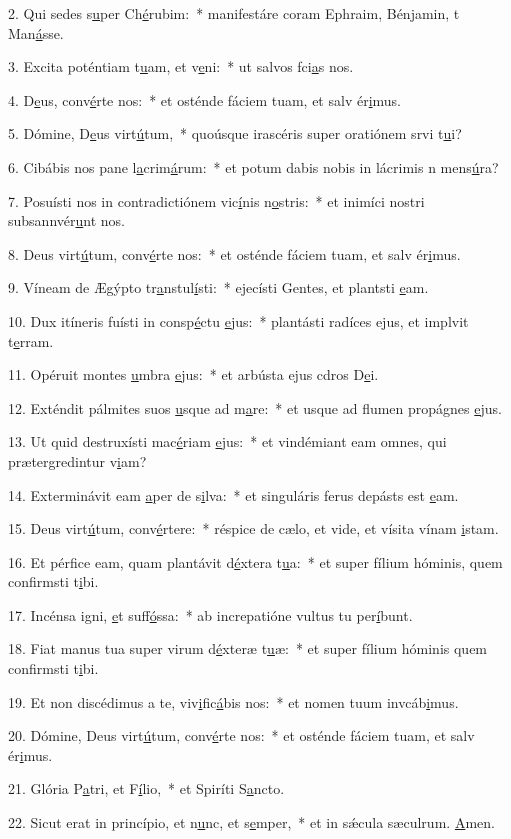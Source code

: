 2. Qui sedes s\uline{u}per Ch\uline{é}rubim:~* manifestáre coram Ephraim, Bénjamin, t Man\uline{á}sse.\par 
3. Excita poténtiam t\uline{u}am, et v\uline{e}ni:~* ut salvos fci\uline{a}s nos.\par 
4. D\uline{e}us, conv\uline{é}rte nos:~* et osténde fáciem tuam, et salv ér\uline{i}mus.\par 
5. Dómine, D\uline{e}us virt\uline{ú}tum,~* quoúsque irascéris super oratiónem srvi t\uline{u}i?\par 
6. Cibábis nos pane l\uline{a}crim\uline{á}rum:~* et potum dabis nobis in lácrimis n mens\uline{ú}ra?\par 
7. Posuísti nos in contradictiónem vic\uline{í}nis n\uline{o}stris:~* et inimíci nostri subsannvér\uline{u}nt nos.\par 
8. Deus virt\uline{ú}tum, conv\uline{é}rte nos:~* et osténde fáciem tuam, et salv ér\uline{i}mus.\par 
9. Víneam de Ægýpto tr\uline{a}nstul\uline{í}sti:~* ejecísti Gentes, et plantsti \uline{e}am.\par 
10. Dux itíneris fuísti in consp\uline{é}ctu \uline{e}jus:~* plantásti radíces ejus, et implvit t\uline{e}rram.\par 
11. Opéruit montes \uline{u}mbra \uline{e}jus:~* et arbústa ejus cdros D\uline{e}i.\par 
12. Exténdit pálmites suos \uline{u}sque ad m\uline{a}re:~* et usque ad flumen propágnes \uline{e}jus.\par 
13. Ut quid destruxísti mac\uline{é}riam \uline{e}jus:~* et vindémiant eam omnes, qui prætergredintur v\uline{i}am?\par 
14. Exterminávit eam \uline{a}per de s\uline{i}lva:~* et singuláris ferus depásts est \uline{e}am.\par 
15. Deus virt\uline{ú}tum, conv\uline{é}rtere:~* réspice de cælo, et vide, et vísita vínam \uline{i}stam.\par 
16. Et pérfice eam, quam plantávit d\uline{é}xtera t\uline{u}a:~* et super fílium hóminis, quem confirmsti t\uline{i}bi.\par 
17. Incénsa igni, \uline{e}t suff\uline{ó}ssa:~* ab increpatióne vultus tu per\uline{í}bunt.\par 
18. Fiat manus tua super virum d\uline{é}xteræ t\uline{u}æ:~* et super fílium hóminis quem confirmsti t\uline{i}bi.\par 
19. Et non discédimus a te, viv\uline{i}fic\uline{á}bis nos:~* et nomen tuum invcáb\uline{i}mus.\par 
20. Dómine, Deus virt\uline{ú}tum, conv\uline{é}rte nos:~* et osténde fáciem tuam, et salv ér\uline{i}mus.\par 
21. Glória P\uline{a}tri, et F\uline{í}lio,~* et Spiríti S\uline{a}ncto.\par 
22. Sicut erat in princípio, et n\uline{u}nc, et s\uline{e}mper,~* et in sǽcula sæculrum. \uline{A}men.\par 

